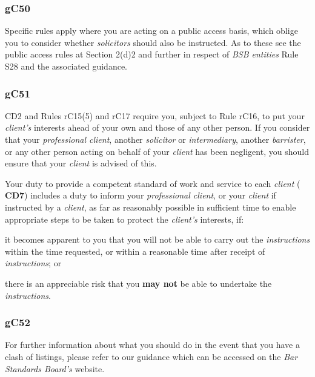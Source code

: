 \subsubsection{\color{darkgrey}gC50}

Specific rules apply where you are acting on a public access basis,
which oblige you to consider whether \emph{solicitors} should also be
instructed. As to these see the public access rules at Section 2(d)2 and
further in respect of \emph{BSB entities} Rule S28 and the associated
guidance.

\subsubsection{\color{darkgrey}gC51}

CD2 and Rules rC15(5) and rC17 require you, subject to Rule rC16, to put
your \emph{client's} interests ahead of your own and those of any other
person. If you consider that your \emph{professional client}, another
\emph{solicitor} or \emph{intermediary}, another \emph{barrister}, or
any other person acting on behalf of your \emph{client} has been
negligent, you should ensure that your \emph{client} is advised of this.




Your duty to provide a competent standard of work and service to each
\emph{client} ( \textbf{\textcolor{mygold}{CD7}}) includes a duty to inform your \emph{professional
client}, or your \emph{client} if instructed by a \emph{client}, as far
as reasonably possible in sufficient time to enable appropriate steps to
be taken to protect the \emph{client's} interests, if:
\begin{numlist}\item it becomes apparent to you that you will not be able to carry out the
\emph{instructions} within the time requested, or within a reasonable
time after receipt of \emph{instructions}; or
\item there is an appreciable risk that you \textcolor{myred}{\textbf{may not}} be able to undertake
the \emph{instructions}.
\end{numlist}


\subsubsection{\color{darkgrey}gC52}

For further information about what you should do in the event that you
have a clash of listings, please refer to our guidance which can be
accessed on the \emph{Bar Standards Board's} website.

